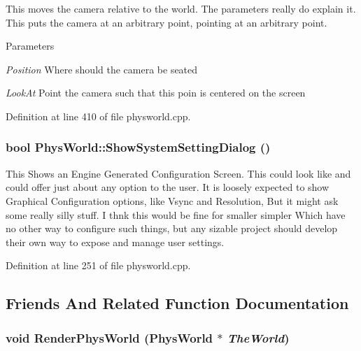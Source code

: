 This moves the camera relative to the world. The parameters really do explain it. This puts the camera at an arbitrary point, pointing at an arbitrary point. 
\begin{DoxyParams}{Parameters}
\item[{\em Position}]Where should the camera be seated \item[{\em LookAt}]Point the camera such that this poin is centered on the screen \end{DoxyParams}


Definition at line 410 of file physworld.cpp.\hypertarget{classPhysWorld_a9b83f04907443c6307956a3c4089e3ca}{
\subsubsection[{ShowSystemSettingDialog}]{\setlength{\rightskip}{0pt plus 5cm}bool PhysWorld::ShowSystemSettingDialog ()}}
\label{db/df5/classPhysWorld_a9b83f04907443c6307956a3c4089e3ca}


This Shows an Engine Generated Configuration Screen. This could look like and could offer just about any option to the user. It is loosely expected to show Graphical Configuration options, like Vsync and Resolution, But it might ask some really silly stuff. I thnk this would be fine for smaller simpler Which have no other way to configure such things, but any sizable project should develop their own way to expose and manage user settings. 

Definition at line 251 of file physworld.cpp.

\subsection{Friends And Related Function Documentation}
\hypertarget{classPhysWorld_a54ca2a75bbccb9b2129f434874f1e693}{
\subsubsection[{RenderPhysWorld}]{\setlength{\rightskip}{0pt plus 5cm}void RenderPhysWorld ({\bf PhysWorld} $\ast$ {\em TheWorld})}}
\label{db/df5/classPhysWorld_a54ca2a75bbccb9b2129f434874f1e693}


